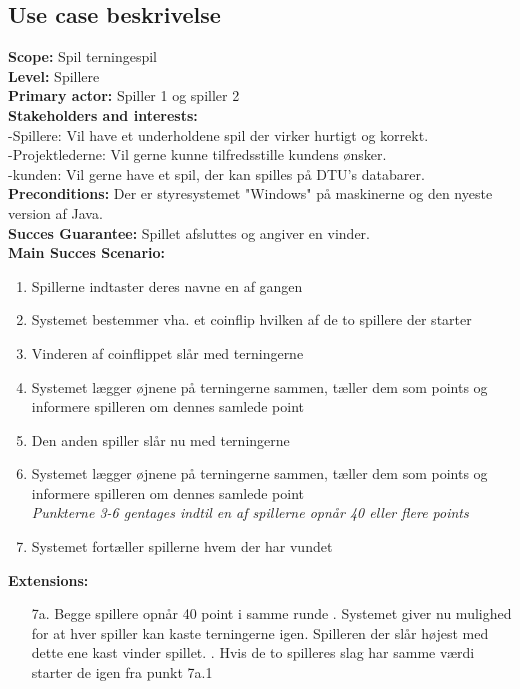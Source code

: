 \documentclass{article}
\begin{document}
\subsection{Use case beskrivelse}
\textbf{Scope:} Spil terningespil\\
\textbf{Level:} Spillere\\
\textbf{Primary actor:} Spiller 1 og spiller 2\\
\textbf{Stakeholders and interests:}\\
-Spillere: Vil have et underholdene spil der virker hurtigt og korrekt.\\
-Projektlederne: Vil gerne kunne tilfredsstille kundens ønsker.\\
-kunden: Vil gerne have et spil, der kan spilles på DTU's databarer.\\
\textbf{Preconditions:} Der er styresystemet "Windows" på maskinerne og den nyeste version af Java.\\
\textbf{Succes Guarantee:} Spillet afsluttes og angiver en vinder.\\
\textbf{Main Succes Scenario:}\\
\begin{enumerate}
\itemsep-0.5em
    \item Spillerne indtaster deres navne en af gangen
    \item Systemet bestemmer vha. et coinflip hvilken af de to spillere der starter
    \item Vinderen af coinflippet slår med terningerne
    \item Systemet lægger øjnene på terningerne sammen, tæller dem som points og informere spilleren om dennes samlede point
    \item Den anden spiller slår nu med terningerne
    \item Systemet lægger øjnene på terningerne sammen, tæller dem som points og informere spilleren om dennes samlede point\\
    \textit{Punkterne 3-6 gentages indtil en af spillerne opnår 40 eller flere points}
    \item Systemet fortæller spillerne hvem der har vundet
\end{enumerate}
\textbf{Extensions:}\\
\begin{enumerate}
\itemsep-0.5em
    \item [7a.] Begge spillere opnår 40 point i samme runde
    . Systemet giver nu mulighed for at hver spiller kan kaste terningerne igen. Spilleren der slår  højest med dette ene kast vinder spillet.
    . Hvis de to spilleres slag har samme værdi starter de igen fra punkt 7a.1

\end{enumerate}
\end{document}
